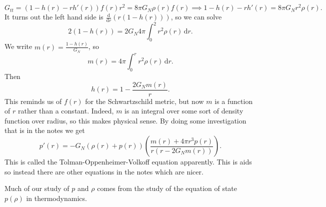 \[
	G_{tt} =\left( 1-h(r)-rh'(r) \right) f(r) r^2 = 8\pi G_N\rho (r)f(r) \implies 1-h(r)-rh'(r) = 8\pi G_Nr^2\rho (r)
.\]
It turns out the left hand side is $\frac{\mathrm{d}}{\mathrm{d}r} \left( r(1-h(r)) \right) $, so we can solve
\[
	2(1-h(r)) = 2G_N4\pi \int_{0}^{2} r^2\rho (r) \,\mathrm{d} r 
.\]
We write $m(r) = \frac{1-h(r)}{G_N} $, so
\[
	m(r) = 4\pi \int_{0}^{r} r^2\rho (r) \,\mathrm{d} r
.\]
Then
\[
	h(r) = 1-\frac{2G_Nm(r)}{r} 
.\]
This reminds us of $f(r)$ for the Schwartzschild metric, but now $m$ is a function of $r$ rather than a constant. Indeed, $m$ is an integral over some sort of density function over radius, so this makes physical sense. By doing some investigation that is in the notes we get
\[
	p'(r) = -G_N(\rho (r)+p(r))\left( \frac{m(r)+4\pi r^3p(r)}{r(r-2G_Nm(r))}  \right) 
.\]
This is called the Tolman-Oppenheimer-Volkoff equation apparently. This is aids so instead there are other equations in the notes which are nicer.

Much of our study of $p$ and $\rho $ comes from the study of the equation of state $p(\rho )$ in thermodynamics. 
